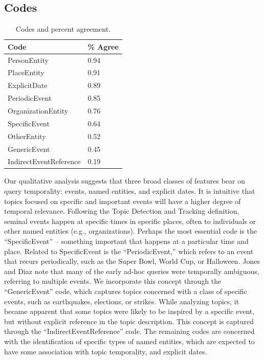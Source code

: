 \documentclass{sig-alternate-05-2015}
\begin{document}
\subsection{Codes}

\begin{table}[!ht]
\scriptsize
\center
\begin{tabular}{| p{3cm} | p{1.5cm}  | } \hline
\bf{Code} & \bf{\% Agree}\\ \hline
PersonEntity&   0.94 \\ \hline
PlaceEntity &  0.91 \\ \hline
ExplicitDate&  0.89 \\ \hline
PeriodicEvent &  0.85 \\ \hline
OrganizationEntity  & 0.76 \\ \hline
SpecificEvent &  0.64 \\ \hline
OtherEntity&  0.52 \\ \hline
GenericEvent  & 0.45 \\ \hline
IndirectEventReference  & 0.19 \\ \hline
\end{tabular}
\caption{Codes and percent agreement.}
\vspace{-.75em}
\label{table.codes}
\end{table}

Our qualitative analysis suggests that three broad classes of features bear on query temporality: events, named entities, and explicit dates. It is intuitive that topics focused on specific and important events will have a higher degree of temporal relevance. Following the Topic Detection and Tracking definition, seminal events happen at specific times in specific places, often to individuals or other named entities (e.g., organizations). Perhaps the most essential code is the ``SpecificEvent'' -- something important that happens at a particular time and place. Related to SpecificEvent is the ``PeriodicEvent,'' which refers to an event that recurs periodically, such as the Super Bowl, World Cup, or Halloween. Jones and Diaz \cite{Jones2007} note that many of the early ad-hoc queries were temporally ambiguous, referring to multiple events. We incorporate this concept through the ``GenericEvent'' code, which captures topics concerned with a class of specific events, such as earthquakes, elections, or strikes. While analyzing topics, it became apparent that some topics were likely to be inspired by a specific event, but without explicit reference in the topic description. This concept is captured through the ``IndirectEventReference'' code. The remaining codes are concerned with the identification of specific types of named entities, which are expected to have some  association with topic temporality, and explicit dates. 
\end{document}
